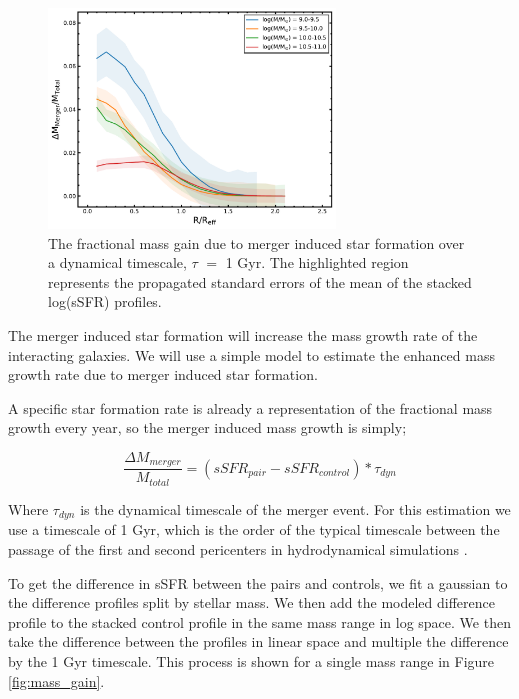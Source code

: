 \documentclass[iop,revtex4,twocolumn,apj,numberedappendix,appendixfloats]{emulateapj}
\begin{document}
\begin{figure}
\centering
\includegraphics[width=3in]{fig/mass_gain.pdf}
\caption[The fractional mass gain due to merger induced star formation.]{The fractional mass gain due to merger induced star formation over a dynamical timescale, $\tau$ $=$ 1 Gyr. The highlighted region represents the propagated standard errors of the mean of the stacked log(sSFR) profiles. }
\label{fig:mass_gain_sum}
\end{figure}

The merger induced star formation will increase the mass growth rate of the interacting galaxies. We will use a simple model to estimate the enhanced mass growth rate due to merger induced star formation. 

A specific star formation rate is already a representation of the fractional mass growth every year, so the merger induced mass growth is simply;

\begin{equation}
\frac{\Delta M_{merger}}{M_{total}} = \left(sSFR_{pair} - sSFR_{control}\right) * \tau_{dyn}
\end{equation}

Where $\tau_{dyn}$ is the dynamical timescale of the merger event. For this estimation we use a timescale of 1 Gyr, which is the order of the typical timescale between the passage of the first and second pericenters in hydrodynamical simulations \citep{Boylan-Kolchin:2008}. 

To get the difference in sSFR between the pairs and controls, we fit a gaussian to the difference profiles split by stellar mass. We then add the modeled difference profile to the stacked control profile in the same mass range in log space. We then take the difference between the profiles in linear space and multiple the difference by the 1 Gyr timescale. This process is shown for a single mass range in Figure \ref{fig:mass_gain}.
\end{document}
